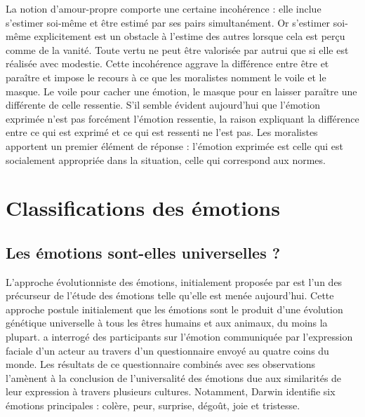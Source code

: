 \documentclass[a4paper,12pt, openany]{book}
\begin{document}
La notion d'amour-propre comporte une certaine incohérence : elle inclue s'estimer soi-même et être estimé par ses pairs simultanément. Or s'estimer soi-même explicitement est un obstacle à l'estime des autres lorsque cela est perçu comme de la vanité. Toute vertu ne peut être valorisée par autrui que si elle est réalisée avec modestie. Cette incohérence aggrave la différence entre être et paraître et impose le recours à ce que les moralistes nomment le voile et le masque. Le voile pour cacher une émotion, le masque pour en laisser paraître une différente de celle ressentie. S'il semble évident aujourd'hui que l'émotion exprimée n'est pas forcément l'émotion ressentie, la raison expliquant la différence entre ce qui est exprimé et ce qui est ressenti ne l'est pas. Les moralistes apportent un premier élément de réponse : l'émotion exprimée est celle qui est socialement appropriée dans la situation, celle qui correspond aux normes.

\section{Classifications des émotions}
\subsection{Les émotions sont-elles universelles ?}
	
L'approche évolutionniste des émotions, initialement proposée par \textcite{darwin1872} est l'un des précurseur de l'étude des émotions telle qu'elle est menée aujourd'hui. Cette approche postule initialement que les émotions sont le produit d'une évolution génétique universelle à tous les êtres humains et aux animaux, du moins la plupart. \textcite{darwin1872} a interrogé des participants sur l'émotion communiquée par l'expression faciale d'un acteur au travers d'un questionnaire envoyé au quatre coins du monde. Les résultats de ce questionnaire combinés avec ses observations l'amènent à la conclusion de l'universalité des émotions due aux similarités de leur expression à travers plusieurs cultures. Notamment, Darwin identifie six émotions principales : colère, peur, surprise, dégoût, joie et tristesse. \par
\end{document}
